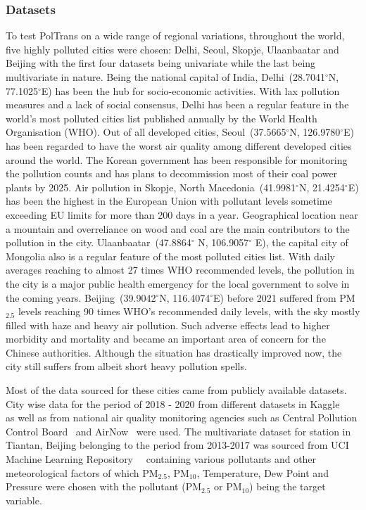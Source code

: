 \documentclass[twocolumn]{svjour3}          %
\begin{document}
\subsubsection{Datasets}
To test {PolTrans} on a wide range of regional variations, throughout the world, five highly polluted cities were chosen: Delhi, Seoul, Skopje, Ulaanbaatar and Beijing with the first four datasets being univariate while the last being multivariate in nature. Being the national capital of India, Delhi~(28.7041${^{\circ}}$N, 77.1025${^{\circ}}$E) has been the hub for socio-economic activities. With lax pollution measures and a lack of social consensus, Delhi has been a regular feature in the world's most polluted cities list published annually by the World Health Organisation (WHO). Out of all developed cities, Seoul~(37.5665${^{\circ}}$N, 126.9780${^{\circ}}$E) has been regarded to have the worst air quality among different developed cities around the world. The Korean government has been responsible for monitoring the pollution counts and has plans to decommission most of their coal power plants by 2025. Air pollution in Skopje, North Macedonia~(41.9981${^{\circ}}$N, 21.4254${^{\circ}}$E) has been the highest in the European Union with pollutant levels sometime exceeding EU limits for more than 200 days in a year. Geographical location near a mountain and overreliance on wood and coal are the main contributors to the pollution in the city. Ulaanbaatar~(47.8864${^{\circ}}$ N, 106.9057${^{\circ}}$ E), the capital city of Mongolia also is a regular feature of the most polluted cities list. With daily averages reaching to almost 27 times WHO recommended levels, the pollution in the city is a major public health emergency for the local government to solve in the coming years. Beijing~(39.9042${^{\circ}}$N, 116.4074${^{\circ}}$E) before 2021 suffered from PM${_{2.5}}$ levels reaching 90 times WHO's recommended daily levels, with the sky mostly filled with haze and heavy air pollution. Such adverse effects lead to higher morbidity and mortality and became an important area of concern for the Chinese authorities. Although the situation has drastically improved now, the city still suffers from albeit short heavy pollution spells.

Most of the data sourced for these cities came from publicly available datasets. City wise data for the period of 2018 - 2020 from different datasets in Kaggle~\cite{Kaggle.Delhi}~\cite{Kaggle.Seoul}~\cite{Kaggle.Skopje}~\cite{Kaggle.Ulaanbaatar} as well as from national air quality monitoring agencies such as Central Pollution Control Board~\cite{CPCB} and AirNow~\cite{AirNow} were used. The multivariate dataset for station in Tiantan, Beijing belonging to the period from 2013-2017 was sourced from UCI Machine Learning Repository~\cite{UCI.2017}~\cite{Zhang.2017} containing various pollutants and other meteorological factors of which PM${_{2.5}}$, PM${_{10}}$, Temperature, Dew Point and Pressure were chosen with the pollutant (PM${_{2.5}}$ or PM${_{10}}$) being the target variable.
\end{document}
